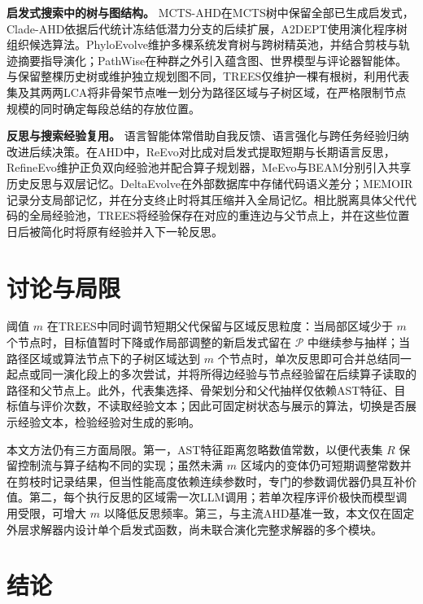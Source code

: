 \documentclass{article}
\begin{document}
\textbf{启发式搜索中的树与图结构。} MCTS-AHD在MCTS树中保留全部已生成启发式\citep{uct, mctsahd}，Clade-AHD依据后代统计冻结低潜力分支的后续扩展\citep{cladeahd}，A2DEPT使用演化程序树组织候选算法\citep{a2dept}。PhyloEvolve维护多棵系统发育树与跨树精英池，并结合剪枝与轨迹摘要指导演化\citep{phyloevolve}；PathWise在种群之外引入蕴含图、世界模型与评论器智能体\citep{pathwise}。与保留整棵历史树或维护独立规划图不同，TREES仅维护一棵有根树，利用代表集及其两两LCA将非骨架节点唯一划分为路径区域与子树区域，在严格限制节点规模的同时确定每段总结的存放位置。

\textbf{反思与搜索经验复用。} 语言智能体常借助自我反馈\citep{selfrefine}、语言强化\citep{reflexion}与跨任务经验归纳\citep{expel}改进后续决策。在AHD中，ReEvo对比成对启发式提取短期与长期语言反思\citep{reevo}，RefineEvo维护正负双向经验池并配合算子规划器\citep{refineevo}，MeEvo与BEAM分别引入共享历史反思与双层记忆\citep{meevo, beam}。DeltaEvolve在外部数据库中存储代码语义差分\citep{deltaevolve}；MEMOIR记录分支局部记忆，并在分支终止时将其压缩并入全局记忆\citep{memorytree}。相比脱离具体父代代码的全局经验池，TREES将经验保存在对应的重连边与父节点上，并在这些位置日后被简化时将原有经验并入下一轮反思。

\section{讨论与局限}\label{ux8ba8ux8bbaux4e0eux5c40ux9650}

阈值 \(m\) 在TREES中同时调节短期父代保留与区域反思粒度：当局部区域少于 \(m\) 个节点时，目标值暂时下降或作局部调整的新启发式留在 \(\mathcal P\) 中继续参与抽样；当路径区域或算法节点下的子树区域达到 \(m\) 个节点时，单次反思即可合并总结同一起点或同一演化段上的多次尝试，并将所得边经验与节点经验留在后续算子读取的路径和父节点上。此外，代表集选择、骨架划分和父代抽样仅依赖AST特征、目标值与评价次数，不读取经验文本；因此可固定树状态与展示的算法，切换是否展示经验文本，检验经验对生成的影响。

本文方法仍有三方面局限。第一，AST特征距离忽略数值常数，以便代表集 \(R\) 保留控制流与算子结构不同的实现；虽然未满 \(m\) 区域内的变体仍可短期调整常数并在剪枝时记录结果，但当性能高度依赖连续参数时，专门的参数调优器\citep{irace}仍具互补价值。第二，每个执行反思的区域需一次LLM调用；若单次程序评价极快而模型调用受限，可增大 \(m\) 以降低反思频率。第三，与主流AHD基准一致，本文仅在固定外层求解器内设计单个启发式函数，尚未联合演化完整求解器的多个模块。

\section{结论}\label{ux7ed3ux8bba}
\end{document}
